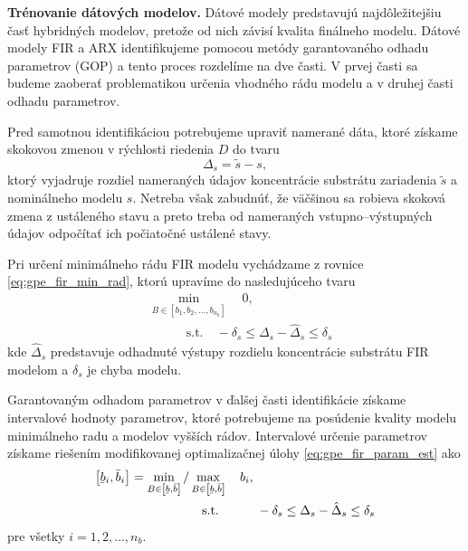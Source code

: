 \textbf{Trénovanie dátových modelov.} Dátové modely predstavujú najdôležitejšiu časť hybridných modelov, pretože od nich závisí kvalita finálneho modelu. Dátové modely FIR a ARX identifikujeme pomocou metódy garantovaného odhadu parametrov (GOP) a tento proces rozdelíme na dve časti. V prvej časti sa budeme zaoberať problematikou určenia vhodného rádu modelu a v druhej časti odhadu parametrov.

Pred samotnou identifikáciou potrebujeme upraviť namerané dáta, ktoré získame skokovou zmenou v rýchlosti riedenia $ D $ do tvaru 
\begin{equation}
	\Delta_{s} = \tilde{s} - s,
\end{equation} 
ktorý vyjadruje rozdiel nameraných údajov koncentrácie substrátu zariadenia $ \tilde{s} $ a nominálneho modelu $ s $.
Netreba však zabudnúť, že väčšinou sa robieva skoková zmena z ustáleného stavu a preto treba od nameraných vstupno--výstupných údajov odpočítať ich počiatočné ustálené stavy.

Pri určení minimálneho rádu FIR modelu vychádzame z rovnice \eqref{eq:gpe_fir_min_rad}, ktorú upravíme do nasledujúceho tvaru
\begin{equation}
	\begin{split}
		& \min_{B \in \left[ b_{1}, b_{2}, \dots, b_{n_b} \right]} \quad 0, \\
		& \qquad \quad \text{s.t.} \quad -\delta_{s} \leq \Delta_{s} - \hat{\Delta}_{s} \leq \delta_{s}
		\end{split}
	\label{eq:fir_min_rad_sub}
\end{equation} 
kde $ \hat{\Delta}_{s} $ predstavuje odhadnuté výstupy rozdielu koncentrácie substrátu FIR modelom a $ \delta_{s} $ je chyba modelu.

Garantovaným odhadom parametrov v ďalšej časti identifikácie získame intervalové hodnoty parametrov, ktoré potrebujeme na posúdenie kvality modelu minimálneho
radu a modelov vyšších rádov. Intervalové určenie parametrov získame riešením modifikovanej optimalizačnej úlohy \eqref{eq:gpe_fir_param_est} ako 
\begin{equation}
	\begin{split}
		\left[ \ubar{b}_i, \bar{b}_i \right] = \min_{B \in \left[ \ubar{b}, \bar{b} \right]} / &\max_{B \in \left[ \ubar{b}, \bar{b} \right]} \quad b_i,\\
		& \quad \text{s.t.} \qquad  \quad -\delta_{s} \leq \Delta_{s} - \hat{\Delta}_{s} \leq \delta_{s}
	\end{split}
\label{eq:fir_param_est_sub}
\end{equation}
pre všetky $ i = 1, 2, \dots, n_b $.

